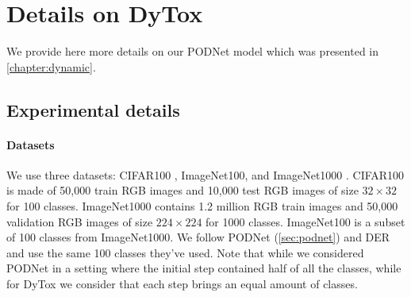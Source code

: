 


%

\section{Details on DyTox}
\label{sec:appendix_dytox}

We provide here more details on our PODNet model which was presented in \autoref{chapter:dynamic}.

%


\subsection{Experimental details}

\paragraph{Datasets} We use three datasets: CIFAR100 \citep{krizhevskycifar100}, ImageNet100, and
ImageNet1000 \citep{deng2009imagenet}. CIFAR100 is made of 50,000 train RGB images and 10,000 test
RGB images of size $32\times32$ for 100 classes. ImageNet1000 contains 1.2 million RGB train images
and 50,000 validation RGB images of size $224\times224$ for 1000 classes. ImageNet100 is a subset of
100 classes from ImageNet1000. We follow PODNet (\autoref{sec:podnet}) and DER \citep{yan2021der}
and use the same 100 classes they've used. Note that while we considered PODNet in a setting where
the initial step contained half of all the classes, while for DyTox we consider that each step
brings an equal amount of classes.

